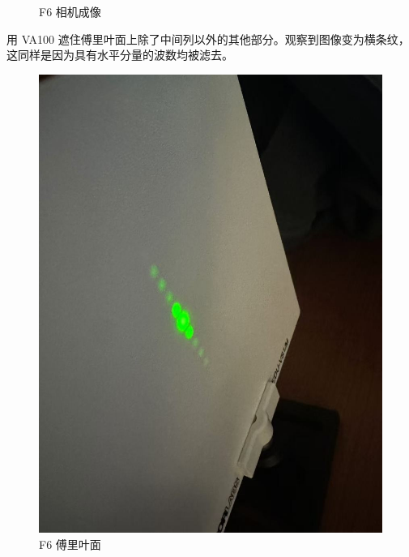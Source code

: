 \documentclass{ctexart}
\begin{document}
\begin{figure}[H]
\begin{minipage}[b]{0.3\textwidth}
    \caption{F6 相机成像}
  \end{minipage}
\end{figure}

用 VA100 遮住傅里叶面上除了中间列以外的其他部分。观察到图像变为横条纹，这同样是因为具有水平分量的波数均被滤去。
\begin{figure}[H]
  \centering
  \begin{minipage}[b]{0.2\textwidth}
    \centering
    \includegraphics[width=\textwidth]{pictures/微信图片_20241017164808.jpg}
    \caption{F6 傅里叶面}
  \end{minipage}
  \hspace{0.1\textwidth} %
  \begin{minipage}[b]{0.3\textwidth}
    \centering

\end{minipage}
\end{figure}
\end{document}
